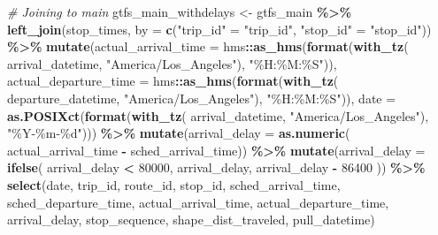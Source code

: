 \documentclass[
  12pt,
]{article}
\newenvironment{Shaded}{\begin{snugshade}}{\end{snugshade}}
\newcommand{\AttributeTok}[1]{\textcolor[rgb]{0.13,0.29,0.53}{#1}}
\newcommand{\CommentTok}[1]{\textcolor[rgb]{0.56,0.35,0.01}{\textit{#1}}}
\newcommand{\DecValTok}[1]{\textcolor[rgb]{0.00,0.00,0.81}{#1}}
\newcommand{\FunctionTok}[1]{\textcolor[rgb]{0.13,0.29,0.53}{\textbf{#1}}}
\newcommand{\NormalTok}[1]{#1}
\newcommand{\OtherTok}[1]{\textcolor[rgb]{0.56,0.35,0.01}{#1}}
\newcommand{\SpecialCharTok}[1]{\textcolor[rgb]{0.81,0.36,0.00}{\textbf{#1}}}
\newcommand{\StringTok}[1]{\textcolor[rgb]{0.31,0.60,0.02}{#1}}
\begin{document}
\begin{Shaded}
\begin{Highlighting}[]
\CommentTok{\# Joining to main}
\NormalTok{gtfs\_main\_withdelays }\OtherTok{\textless{}{-}}\NormalTok{ gtfs\_main }\SpecialCharTok{\%\textgreater{}\%}
  \FunctionTok{left\_join}\NormalTok{(stop\_times, }\AttributeTok{by =} \FunctionTok{c}\NormalTok{(}\StringTok{"trip\_id"} \OtherTok{=} \StringTok{"trip\_id"}\NormalTok{,}
                              \StringTok{"stop\_id"} \OtherTok{=} \StringTok{"stop\_id"}\NormalTok{)) }\SpecialCharTok{\%\textgreater{}\%}
  \FunctionTok{mutate}\NormalTok{(}\AttributeTok{actual\_arrival\_time =}\NormalTok{ hms}\SpecialCharTok{::}\FunctionTok{as\_hms}\NormalTok{(}\FunctionTok{format}\NormalTok{(}\FunctionTok{with\_tz}\NormalTok{(}
\NormalTok{    arrival\_datetime, }\StringTok{"America/Los\_Angeles"}\NormalTok{), }\StringTok{"\%H:\%M:\%S"}\NormalTok{)),}
         \AttributeTok{actual\_departure\_time =}\NormalTok{ hms}\SpecialCharTok{::}\FunctionTok{as\_hms}\NormalTok{(}\FunctionTok{format}\NormalTok{(}\FunctionTok{with\_tz}\NormalTok{(}
\NormalTok{           departure\_datetime, }\StringTok{"America/Los\_Angeles"}\NormalTok{), }\StringTok{"\%H:\%M:\%S"}\NormalTok{)),}
         \AttributeTok{date =} \FunctionTok{as.POSIXct}\NormalTok{(}\FunctionTok{format}\NormalTok{(}\FunctionTok{with\_tz}\NormalTok{(}
\NormalTok{           arrival\_datetime, }\StringTok{"America/Los\_Angeles"}\NormalTok{), }\StringTok{"\%Y{-}\%m{-}\%d"}\NormalTok{))) }\SpecialCharTok{\%\textgreater{}\%}
  \FunctionTok{mutate}\NormalTok{(}\AttributeTok{arrival\_delay =} \FunctionTok{as.numeric}\NormalTok{(}
\NormalTok{    actual\_arrival\_time }\SpecialCharTok{{-}}\NormalTok{ sched\_arrival\_time)) }\SpecialCharTok{\%\textgreater{}\%}
  \FunctionTok{mutate}\NormalTok{(}\AttributeTok{arrival\_delay =} \FunctionTok{ifelse}\NormalTok{(}
\NormalTok{    arrival\_delay }\SpecialCharTok{\textless{}} \DecValTok{80000}\NormalTok{, arrival\_delay,}
\NormalTok{    arrival\_delay }\SpecialCharTok{{-}} \DecValTok{86400}
\NormalTok{    )) }\SpecialCharTok{\%\textgreater{}\%}
  \FunctionTok{select}\NormalTok{(date, }
\NormalTok{         trip\_id, }
\NormalTok{         route\_id, }
\NormalTok{         stop\_id, }
\NormalTok{         sched\_arrival\_time, }
\NormalTok{         sched\_departure\_time,}
\NormalTok{         actual\_arrival\_time,}
\NormalTok{         actual\_departure\_time,}
\NormalTok{         arrival\_delay,}
\NormalTok{         stop\_sequence,}
\NormalTok{         shape\_dist\_traveled,}
\NormalTok{         pull\_datetime)}
\end{Highlighting}
\end{Shaded}
\end{document}
